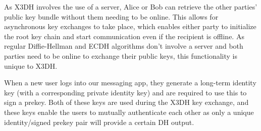 As X3DH involves the use of a server, Alice or Bob can retrieve the other parties' public key bundle without them needing to be online. This allows for asynchronous key exchanges to take place, which enables either party to initialize the root key chain and start communication even if the recipient is offline. As regular Diffie-Hellman and ECDH algorithms don't involve a server and both parties need to be online to exchange their public keys, this functionality is unique to X3DH.

When a new user logs into our messaging app, they generate a long-term identity key (with a corresponding private identity key) and are required to use this to sign a prekey. Both of these keys are used during the X3DH key exchange, and these keys enable the users to mutually authenticate each other as only a unique identity/signed prekey pair will provide a certain DH output.